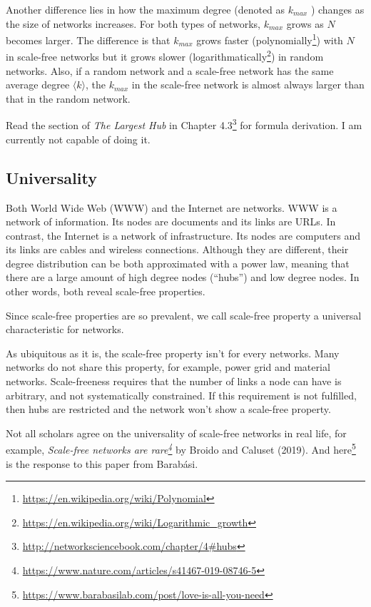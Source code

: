 \documentclass[
]{krantz}
\makeatletter
\renewcommand{\href}[2]{#2\footnote{\url{#1}}}
\newenvironment{kframe}{%
\medskip{}
\setlength{\fboxsep}{.8em}
 \def\at@end@of@kframe{}%
 \ifinner\ifhmode%
  \def\at@end@of@kframe{\end{minipage}}%
  \begin{minipage}{\columnwidth}%
 \fi\fi%
 \def\FrameCommand##1{\hskip\@totalleftmargin \hskip-\fboxsep
 \colorbox{shadecolor}{##1}\hskip-\fboxsep
     \hskip-\linewidth \hskip-\@totalleftmargin \hskip\columnwidth}%
 \MakeFramed {\advance\hsize-\width
   \@totalleftmargin\z@ \linewidth\hsize
   \@setminipage}}%
 {\par\unskip\endMakeFramed%
 \at@end@of@kframe}
\newenvironment{rmdblock}[1]
  {
  \begin{itemize}
  \renewcommand{\labelitemi}{
    \raisebox{-.7\height}[0pt][0pt]{
      {\setkeys{Gin}{width=3em,keepaspectratio}\texttt{[image: images/\#1]}}
    }
  }
  \setlength{\fboxsep}{1em}
  \begin{kframe}
  \item
  }
  {
  \end{kframe}
  \end{itemize}
  }
\newenvironment{rmdimportant}
  {\begin{rmdblock}{important}}
  {\end{rmdblock}}
\makeatother
\begin{document}
Another difference lies in how the maximum degree (denoted as \(k_{max}\) ) changes as the size of networks increases. For both types of networks, \(k_{max}\) grows as \(N\) becomes larger. The difference is that \(k_{max}\) grows faster (\href{https://en.wikipedia.org/wiki/Polynomial}{polynomially}) with \(N\) in scale-free networks but it grows slower (\href{https://en.wikipedia.org/wiki/Logarithmic_growth}{logarithmatically}) in random networks. Also, if a random network and a scale-free network has the same average degree \(\langle k \rangle\), the \(k_{max}\) in the scale-free network is almost always larger than that in the random network.

Read the section of \emph{The Largest Hub} in \href{http://networksciencebook.com/chapter/4\#hubs}{Chapter 4.3} for formula derivation. I am currently not capable of doing it.

\hypertarget{universality}{%
\subsection{Universality}\label{universality}}

Both World Wide Web (WWW) and the Internet are networks. WWW is a network of information. Its nodes are documents and its links are URLs. In contrast, the Internet is a network of infrastructure. Its nodes are computers and its links are cables and wireless connections. Although they are different, their degree distribution can be both approximated with a power law, meaning that there are a large amount of high degree nodes (``hubs'') and low degree nodes. In other words, both reveal scale-free properties.

Since scale-free properties are so prevalent, we call scale-free property a universal characteristic for networks.

As ubiquitous as it is, the scale-free property isn't for every networks. Many networks do not share this property, for example, power grid and material networks. Scale-freeness requires that the number of links a node can have is arbitrary, and not systematically constrained. If this requirement is not fulfilled, then hubs are restricted and the network won't show a scale-free property.

\begin{rmdimportant}
Not all scholars agree on the universality of scale-free networks in real life, for example, \emph{\href{https://www.nature.com/articles/s41467-019-08746-5}{Scale-free networks are rare}} by Broido and Caluset (2019). And \href{https://www.barabasilab.com/post/love-is-all-you-need}{here} is the response to this paper from Barabási.
\end{rmdimportant}
\end{document}
